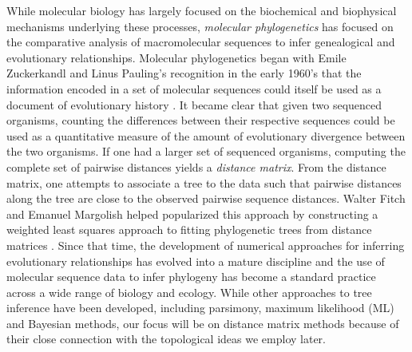 While molecular biology has largely focused on the biochemical and biophysical mechanisms underlying these processes, \emph{molecular phylogenetics} has focused on the comparative analysis of macromolecular sequences to infer genealogical and evolutionary relationships.
Molecular phylogenetics began with Emile Zuckerkandl and Linus Pauling's recognition in the early 1960's that the information encoded in a set of molecular sequences could itself be used as a document of evolutionary history \cite{Zuckerkandl:1962,Zuckerkandl:1965wi}.
It became clear that given two sequenced organisms, counting the differences between their respective sequences could be used as a quantitative measure of the amount of evolutionary divergence between the two organisms.
If one had a larger set of sequenced organisms, computing the complete set of pairwise distances yields a \emph{distance matrix}.
From the distance matrix, one attempts to associate a tree to the data such that pairwise distances along the tree are close to the observed pairwise sequence distances.
Walter Fitch and Emanuel Margolish helped popularized this approach by constructing a weighted least squares approach to fitting phylogenetic trees from distance matrices \cite{Fitch:1967we}.
Since that time, the development of numerical approaches for inferring evolutionary relationships has evolved into a mature discipline and the use of molecular sequence data to infer phylogeny has become a standard practice across a wide range of biology and ecology.
While other approaches to tree inference have been developed, including parsimony, maximum likelihood (ML) and Bayesian methods, our focus will be on distance matrix methods because of their close connection with the topological ideas we employ later.


